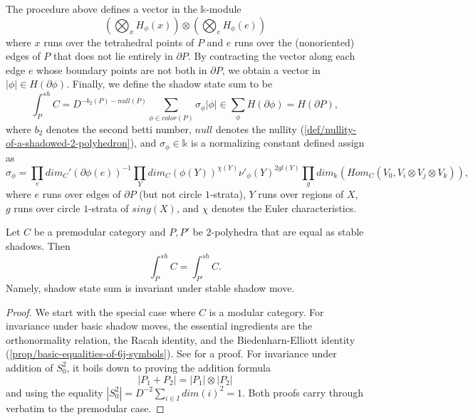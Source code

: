 \begin{definition}
\noindent The procedure above defines a vector in the
$\mathbb{k}$-module
$$\left( \bigotimes_{x} H_{\phi}(x) \right) \otimes \left( \bigotimes_{e} H_{\phi}(e) \right)$$
where $x$ runs over the tetrahedral points of $P$ and $e$ runs
over the (nonoriented) edges of $P$ that does not lie entirely in
$\partial P$. By contracting the vector along each edge $e$ whose
boundary points are not both in $\partial P$, we obtain a vector
in $|\phi| \in H(\partial \phi)$. Finally, we define the shadow state sum
to be
$$\int^{sh}_{P} C = D^{-b_{2}(P) - null(P)} \sum_{\phi \in color(P)} \sigma_{\phi} |\phi| \in \sum_{\phi} H(\partial \phi) = H(\partial P),$$
where $b_{2}$ denotes the second betti number, $null$ denotes the
nullity (\ref{def/nullity-of-a-shadowed-2-polyhedron}), and
$\sigma_{\phi} \in \mathbb{k}$ is a normalizing constant defined
assign as
$$\sigma_{\phi} = \prod_{e} dim_{C}'(\partial\phi(e))^{-1} \prod_{Y} dim_{C}(\phi(Y))^{\chi(Y)} \nu'_{\phi}(Y)^{2gl(Y)} \prod_{g} dim_{\mathbb{k}}(Hom_{C}(V_{0}, V_{i} \otimes V_{j} \otimes V_{k})),$$
where $e$ runs over edges of $\partial P$ (but not circle
$1$-strata), $Y$ runs over regions of $X$, $g$ runs over circle
$1$-strata of $sing(X)$, and $\chi$ denotes the Euler
characteristics.
\end{definition}

\begin{proposition}\label{prop/shadow-state-sum-is-invariant-under-stable-shadow-move}
  Let $C$ be a premodular category and $P, P'$ be $2$-polyhedra
  that are equal as stable shadows. Then
  $$\int^{sh}_{P} C = \int^{sh}_{P'} C.$$
  Namely, shadow state sum is invariant under stable shadow move.
\end{proposition}
\begin{proof}
  We start with the special case where $C$ is a modular category.
  For invariance under basic shadow moves, the essential
  ingredients are the orthonormality relation, the Racah
  identity, and the Biedenharn-Elliott identity
  (\ref{prop/basic-equalities-of-6j-symbols}). See \cite[theorem
  X.2.1]{turaev-qiok-3-manifolds} for a proof. For invariance
  under addition of $S^{2}_{0}$, it boils down to proving the
  addition formula $$|P_{1} + P_{2}| = |P_{1}| \otimes |P_{2}|$$
  \cite[theorem X.2.2]{turaev-qiok-3-manifolds} and using the
  equality $|S^{2}_{0}| = D^{-2} \sum_{i \in I} dim(i)^{2} = 1$.
  Both proofs carry through verbatim to the premodular case.
\end{proof}

